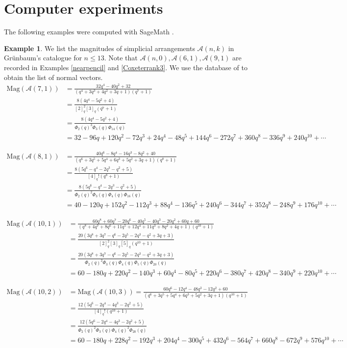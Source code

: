\documentclass{amsart}
\numberwithin{equation}{section}
\theoremstyle{plain}
\theoremstyle{remark}
\theoremstyle{definition}
\newtheorem{ex}[thm]{Example}
\numberwithin{equation}{section}
\newcommand{\A}{\mathcal{A}}
\newcommand{\Mag}{\mathrm{Mag}}
\begin{document}
\section{Computer experiments}\label{appendix}
The following examples were computed with SageMath \cite{sagemath}.
\begin{ex}\label{exa1}
We list the magnitudes of simplicial arrangements $\A(n,k)$ in Gr\"unbaum's catalogue \cite{Grunbaum2009} for $n\leq 13$. Note that $\A(n,0),\A(6,1),\A(9,1)$ are recorded in Examples \ref{nearpencil} and \ref{Coxeterrank3}. We use the database of \cite{Cuntz2022} to obtain the list of normal vectors.
    \begin{align*}
        \Mag(\A(7,1))&=\frac{32q^4-40q^2+32}{(q^4+3q^3+4q^2+3q+1)(q^7+1)}\\
        &=\frac{8(4q^4-5q^2+4)}{[2]_q^2[3]_q(q^7+1)}\\
        &=\frac{8(4q^4-5q^2+4)}{\Phi_2(q)^3\Phi_3(q)\Phi_{14}(q)}\\
        &=32-96q+120q^2-72q^3+24q^4-48q^5+144q^6-272q^7+360q^8-336q^9+240q^{10}+\cdots
        \end{align*}
        
        \begin{align*}
        \Mag(\A(8,1))&=\frac{40q^6-8q^4-16q^3-8q^2+40}{(q^6+3q^5+5q^4+6q^3+5q^2+3q+1)(q^8+1)}\\
        &=\frac{8(5q^6-q^4-2q^3-q^2+5)}{[4]_q!(q^8+1)}\\
        &=\frac{8(5q^6-q^4-2q^3-q^2+5)}{\Phi_2(q)^2\Phi_3(q)\Phi_4(q)\Phi_{16}(q)}\\
        &=40-120q+152q^2-112q^3+88q^4-136q^5+240q^6-344q^7+352q^8-248q^9+176q^{10}+\cdots
        \end{align*}

\begin{align*}
    \Mag(\A(10,1))&=\frac{60q^8+60q^7-20q^6-40q^5-40q^3-20q^2+60q+60}{(q^8+4q^7+8q^6+11q^5+12q^4+11q^3+8q^2+4q+1)(q^{10}+1)}\\
    &=\frac{20(3q^8+3q^7-q^6-2q^5-2q^3-q^2+3q+3)}{[2]_q^2[3]_q[5]_q(q^{10}+1)}\\
    &=\frac{20(3q^8+3q^7-q^6-2q^5-2q^3-q^2+3q+3)}{\Phi_2(q)^2\Phi_3(q)\Phi_4(q)\Phi_5(q)\Phi_{20}(q)}\\
    &=60-180q+220q^2-140q^3+60q^4-80q^5+220q^6-380q^7+420q^8-340q^9+220q^{10}+\cdots
\end{align*}
        
        \begin{align*}
        \Mag(\A(10,2))&=\Mag(\A(10,3))=\frac{60q^6-12q^4-48q^3-12q^2+60}{(q^6+3q^5+5q^4+6q^3+5q^2+3q+1)(q^{10}+1)}\\
        &=\frac{12(5q^6-2q^4-4q^3-2q^2+5)}{[4]_q!(q^{10}+1)}\\
        &=\frac{12(5q^6-2q^4-4q^3-2q^2+5)}{\Phi_2(q)^2\Phi_3(q)\Phi_4(q)^2\Phi_{20}(q)}\\
        &=60-180q+228q^2-192q^3+204q^4-300q^5+432q^6-564q^7+660q^8-672q^9+576q^{10}+\cdots
        \end{align*}
        

\end{ex}
\end{document}
